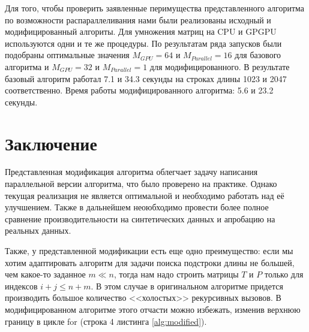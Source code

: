 \documentclass[a4paper,12pt]{article}  %
\theoremstyle{definition}
\theoremstyle{remark}
\begin{document}
% 

Для того, чтобы проверить заявленные перимущества представленного алгоритма по возможности распараллеливания нами были реализованы исходный и модифицированный алгориты. Для умножения матриц на CPU и GPGPU используются одни и те же процедуры. По результатам ряда запусков были подобраны оптимальные значения $M_{GPU} = 64$ и $M_{Parallel} = 16$ для базового алгоритма и $M_{GPU} = 32$ и $M_{Parallel} = 1$ для модифицированного. В результате базовый алгоритм работал 7.1 и 34.3 секунды на строках длины 1023 и 2047 соответственно. Время работы модифицированного алгоритма: 5.6 и 23.2 секунды. 

\section{Заключение}

Представленная модификация алгоритма облегчает задачу написания параллельной версии алгоритма, что было проверено на практике. Однако текущая реализация не является оптимальной и необходимо работать над её улучшением. Также в дальнейшем неоюбходимо  провести более полное сравнение производительности на синтетических данных и апробацию на реальных данных.

Также, у представленной модификации есть еще одно преимущество: если мы хотим адаптировать алгоритм для задачи поиска подстроки длины не большей, чем какое-то заданное $m \ll n$, тогда нам надо строить матрицы $T$ и $P$ только для индексов $i + j \leqslant n + m$. В этом случае в оригинальном алгоритме придется производить большое количество <<холостых>> рекурсивных вызовов. В модифицированном алгоритме этого отчасти можно избежать, изменив верхнюю границу в цикле for (строка 4 листинга \ref{alg:modified}).



\end{document}
